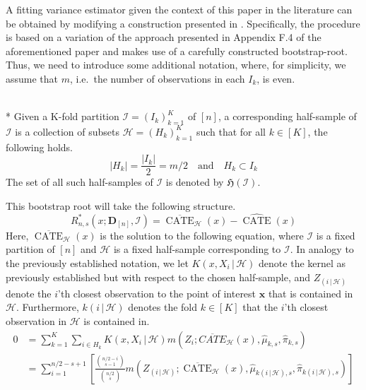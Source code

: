 A fitting variance estimator given the context of this paper in the literature can be obtained by modifying a construction presented in \citet{ritzwoller_simultaneous_2024}.
Specifically, the procedure is based on a variation of the approach presented in Appendix F.4 of the aforementioned paper and makes use of a carefully constructed bootstrap-root.
Thus, we need to introduce some additional notation, where, for simplicity, we assume that $m$, i.e.\ the number of observations in each $I_k$, is even.
\begin{boxD}
	\begin{dfn}\label{def:CF_HSample}\mbox{}\\*
		Given a K-fold partition $\mathcal{I} = \left(I_k\right)_{k = 1}^{K}$ of $[n]$, a corresponding half-sample of $\mathcal{I}$ is a collection of subsets $\mathcal{H} = \left(H_{k}\right)_{k = 1}^{K}$ such that for all $k \in [K]$, the following holds.
		\begin{equation}
			|H_k| = \frac{|I_k|}{2}= m/2
			\quad \text{and} \quad
			H_k \subset I_k
		\end{equation}
		The set of all such half-samples of $\mathcal{I}$ is denoted by $\mathfrak{H}\left(\mathcal{I}\right)$.
	\end{dfn}
\end{boxD}
This bootstrap root will take the following structure.
\begin{equation}
	R^{*}_{n,s}\left(x; \mathbf{D}_{[n]}, \mathcal{I}\right)
	= \overline{\operatorname{CATE}}_{\mathcal{H}}\left(x\right)
	- \widehat{\operatorname{CATE}}\left(x\right)
\end{equation}
Here, $\overline{\operatorname{CATE}}_{\mathcal{H}}\left(x\right)$ is the solution to the following equation, where $\mathcal{I}$ is a fixed partition of $[n]$ and $\mathcal{H}$ is a fixed half-sample corresponding to $\mathcal{I}$.
In analogy to the previously established notation, we let $K(x, X_{i} \, | \, \mathcal{H})$ denote the kernel as previously established but with respect to the chosen half-sample, and $Z_{(i \, | \, \mathcal{H})}$ denote the $i$'th closest observation to the point of interest $\mathbf{x}$ that is contained in $\mathcal{H}$.
Furthermore, $k(i \, | \, \mathcal{H})$ denotes the fold $k \in [K]$ that the $i$'th closest observation in $\mathcal{H}$ is contained in.
\begin{equation}
	\begin{aligned}
		0 & = \sum_{k = 1}^{K} \sum_{i \in H_k} K(x, X_{i} \, | \, \mathcal{H}) m\left(Z_{i}; \overline{CATE}_{\mathcal{H}}\left(x\right), \hat{\mu}_{k,s}, \hat{\pi}_{k,s}\right)\\
	 	& = \sum_{i = 1}^{n/2 - s + 1} \left[\frac{\binom{n/2-i}{s-1}}{\binom{n/2}{s}} m\left(Z_{(i \, | \, \mathcal{H})}; \overline{\operatorname{CATE}}_{\mathcal{H}}\left(x\right), \hat{\mu}_{k(i \, | \, \mathcal{H}),s}, \hat{\pi}_{k(i\, | \, \mathcal{H}),s}\right)\right]
	\end{aligned}
\end{equation}
